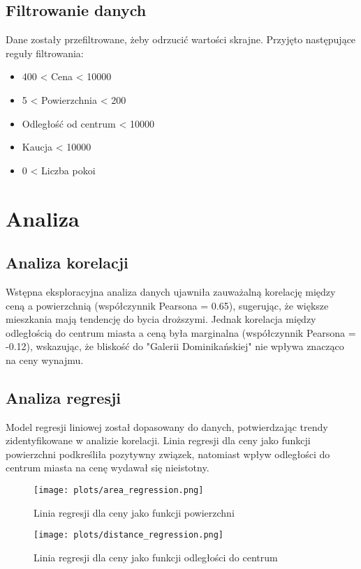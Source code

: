 \documentclass[12pt]{article}
\begin{document}
\newpage

\subsection{Filtrowanie danych}
Dane zostały przefiltrowane, żeby odrzucić wartości skrajne. Przyjęto następujące reguły filtrowania:
\begin{itemize}
  \item 400 < Cena < 10000
  \item 5 < Powierzchnia < 200
  \item Odległość od centrum < 10000
  \item Kaucja < 10000
  \item 0 < Liczba pokoi 
\end{itemize}

\section{Analiza}
\subsection{Analiza korelacji}
Wstępna eksploracyjna analiza danych ujawniła zauważalną korelację między ceną a powierzchnią (współczynnik Pearsona = 0.65), sugerując, że większe mieszkania mają tendencję do bycia droższymi. Jednak korelacja między odległością do centrum miasta a ceną była marginalna (współczynnik Pearsona = -0.12), wskazując, że bliskość do "Galerii Dominikańskiej" nie wpływa znacząco na ceny wynajmu.


\subsection{Analiza regresji}
Model regresji liniowej został dopasowany do danych, potwierdzając trendy zidentyfikowane w analizie korelacji. Linia regresji dla ceny jako funkcji powierzchni podkreśliła pozytywny związek, natomiast wpływ odległości do centrum miasta na cenę wydawał się nieistotny.

\begin{figure}[h]
  \centering
  \texttt{[image: plots/area\_regression.png]}
  \caption{Linia regresji dla ceny jako funkcji powierzchni}
  \label{fig:area_regression}
\end{figure}

\begin{figure}[h]
  \centering
  \texttt{[image: plots/distance\_regression.png]}
  \caption{Linia regresji dla ceny jako funkcji odległości do centrum}
  \label{fig:distance_regression}
\end{figure}
\end{document}
